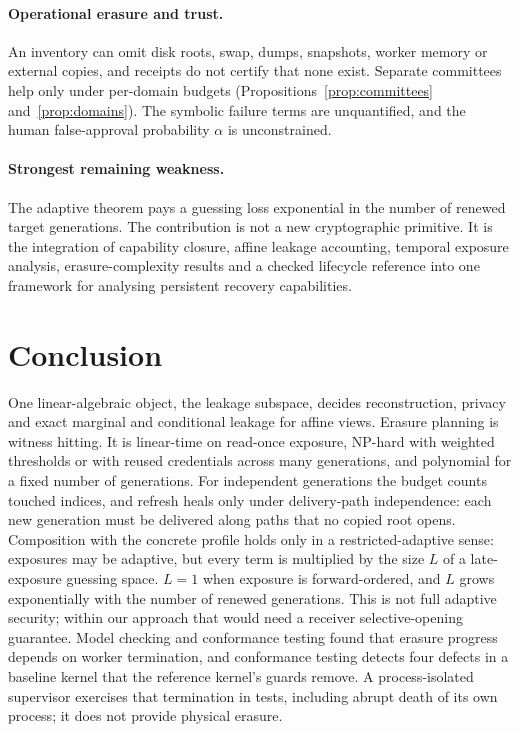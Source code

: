 \documentclass[pdflatex,sn-mathphys-num]{sn-jnl}%
\theoremstyle{plain}
\theoremstyle{definition}
\begin{document}
\paragraph{Operational erasure and trust.}
An inventory can omit disk roots, swap, dumps, snapshots, worker memory or external copies, and receipts do not certify that none exist. Separate committees help only under per-domain budgets (Propositions~\ref{prop:committees} and~\ref{prop:domains}). The symbolic failure terms are unquantified, and the human false-approval probability $\alpha$ is unconstrained.

\paragraph{Strongest remaining weakness.}
The adaptive theorem pays a guessing loss exponential in the number of renewed target generations. The contribution is not a new cryptographic primitive. It is the integration of capability closure, affine leakage accounting, temporal exposure analysis, erasure-complexity results and a checked lifecycle reference into one framework for analysing persistent recovery capabilities.


\section{Conclusion}
One linear-algebraic object, the leakage subspace, decides reconstruction, privacy and exact marginal and conditional leakage for affine views. Erasure planning is witness hitting. It is linear-time on read-once exposure, NP-hard with weighted thresholds or with reused credentials across many generations, and polynomial for a fixed number of generations. For independent generations the budget counts touched indices, and refresh heals only under delivery-path independence: each new generation must be delivered along paths that no copied root opens. Composition with the concrete profile holds only in a restricted-adaptive sense: exposures may be adaptive, but every term is multiplied by the size $L$ of a late-exposure guessing space. $L=1$ when exposure is forward-ordered, and $L$ grows exponentially with the number of renewed generations. This is not full adaptive security; within our approach that would need a receiver selective-opening guarantee. Model checking and conformance testing found that erasure progress depends on worker termination, and conformance testing detects four defects in a baseline kernel that the reference kernel's guards remove. A process-isolated supervisor exercises that termination in tests, including abrupt death of its own process; it does not provide physical erasure.
\end{document}
